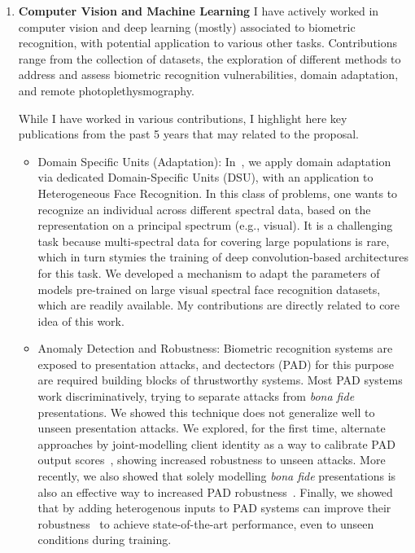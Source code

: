 \documentclass[a4paper]{nihbiosketch}
\begin{document}
\begin{enumerate}

\item \textbf{Computer Vision and Machine Learning} I have actively worked in
    computer vision and deep learning (mostly) associated to biometric
    recognition, with potential application to various other tasks.
    Contributions range from the collection of datasets, the exploration of
    different methods to address and assess biometric recognition
    vulnerabilities, domain adaptation, and remote photoplethysmography.

    While I have worked in various contributions, I highlight here key
    publications from the past 5 years that may related to the proposal.

    \begin{itemize}

        \item Domain Specific Units (Adaptation): In~\cite{tifs-2019}, we apply
            domain adaptation via dedicated Domain-Specific Units (DSU), with
            an application to Heterogeneous Face Recognition.  In this class of
            problems, one wants to recognize an individual across different
            spectral data,  based on the representation on a principal spectrum
            (e.g., visual).  It is a challenging task because multi-spectral
            data for covering large populations is rare, which in turn stymies
            the training of deep convolution-based architectures for this task.
            We developed a mechanism to adapt the parameters of models
            pre-trained on large visual spectral face recognition datasets,
            which are readily available.  My contributions are directly related
            to core idea of this work.

      \item Anomaly Detection and Robustness: Biometric recognition systems are
          exposed to presentation attacks, and dectectors (PAD) for this
          purpose are required building blocks of thrustworthy systems.  Most
          PAD systems work discriminatively, trying to separate attacks from
          \textit{bona fide} presentations.  We showed this technique does not
          generalize well to unseen presentation attacks.  We explored, for the
          first time, alternate approaches by joint-modelling client identity
          as a way to calibrate PAD output scores~\cite{tifs-2015}, showing
          increased robustness to unseen attacks.  More recently, we also
          showed that solely modelling \textit{bona fide} presentations is also
          an effective way to increased PAD robustness~\cite{icb-2018}.
          Finally, we showed that by adding heterogenous inputs to PAD systems
          can improve their robustness~\cite{tifs-2019-2} to achieve
          state-of-the-art performance, even to unseen conditions during
          training.


\end{itemize}
\end{enumerate}
\end{document}
